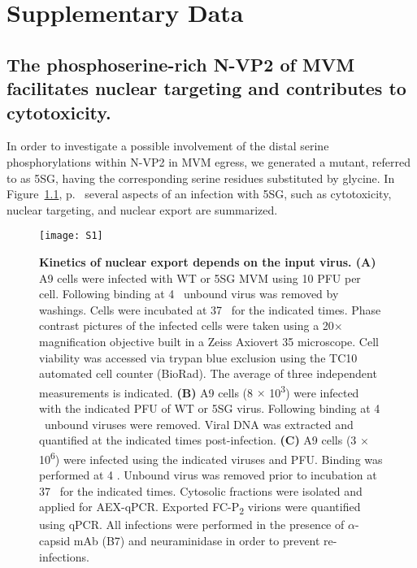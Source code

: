 
\chapter{Supplementary Data} %

\label{Results} %


\section{The phosphoserine-rich N-VP2 of MVM facilitates nuclear targeting and contributes to cytotoxicity.}


\renewcommand{\thefigure}{S\arabic{figure}}
\setcounter{figure}{0}

In order to investigate a possible involvement of the distal serine phosphorylations within N-VP2 in MVM egress, we generated a mutant, referred to as 5SG, having the corresponding serine residues substituted by glycine. In Figure~\ref{S1}, p.~\pageref{S1} several aspects of an infection with 5SG, such as cytotoxicity, nuclear targeting, and nuclear export are summarized.

\begin{figure}
\centering
  \texttt{[image: S1]}
  \caption[Kinetics of nuclear export depends on the input virus.]
   {\textbf{Kinetics of nuclear export depends on the input virus. (A)} A9 cells were infected with WT or 5SG MVM using 10 PFU per cell. Following binding at 4 \textcelsius~unbound virus was removed by washings. Cells were incubated at 37 \textcelsius~for the indicated times. Phase contrast pictures of the infected cells were taken using a 20$\times$ magnification objective built in a Zeiss Axiovert 35 microscope. Cell viability was accessed via trypan blue exclusion using the TC10\textsuperscript{\texttrademark} automated cell counter (BioRad). The average of three independent measurements is indicated. \textbf{(B)} A9 cells (8 $\times$ 10\textsuperscript{3}) were infected with the indicated PFU of WT or 5SG virus. Following binding at 4 \textcelsius~unbound viruses were removed. Viral DNA was extracted and quantified at the indicated times post-infection. \textbf{(C)} A9 cells (3 $\times$ 10\textsuperscript{6}) were infected using the indicated viruses and PFU. Binding was performed at 4 \textcelsius. Unbound virus was removed prior to incubation at 37 \textcelsius~for the indicated times. Cytosolic fractions were isolated and applied for AEX-qPCR. Exported FC-P\textsubscript{2} virions were quantified using qPCR. All infections were performed in the presence of $\alpha$-capsid mAb (B7) and neuraminidase in order to prevent re-infections.} 
\label{S1}
\end{figure}



